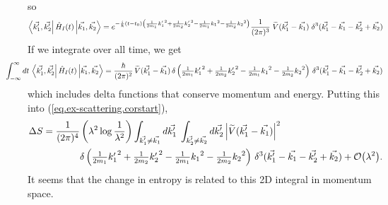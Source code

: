 so 
\[
\left\langle\vec{k_1^\prime}, \vec{k_2^\prime}\right| \hat{H}_I(t)\left|\vec{k_1}, \vec{k_2}\right\rangle
=
e^{-\frac{i}{\hbar}\left(t-t_0\right)\left(\frac{1}{2m_1}{{k_1^\prime}}^2 + \frac{1}{2m_2}{{k_2^\prime}}^2 - \frac{1}{2m_1}{k_1}^2 - \frac{1}{2m_2}{k_2}^2\right)}\frac{1}{(2\pi)^3}\;\widetilde{V}(\vec{k_1^\prime}-\vec{k_1}) \;\delta^3(\vec{k_1^\prime}-\vec{k_1}-\vec{k_2^\prime}+\vec{k_2})
\]
If we integrate over all time, we get
\[
\hspace{-3em}
\int_{-\infty}^\infty dt \,\bra{\vec{k_1^\prime}, \vec{k_2^\prime}} \op{H}_I(t)\ket{\vec{k_1}, \vec{k_2}}
=
\frac{\hbar}{(2\pi)^2}\,\widetilde{V}(\vec{k_1^\prime}-\vec{k_1})\,\delta\left({\textstyle\frac{1}{2m_1}{{k_1^\prime}}^2 + \frac{1}{2m_2}{{k_2^\prime}}^2 - \frac{1}{2m_1}{k_1}^2 - \frac{1}{2m_2}{k_2}^2}\right) \,\delta^3(\vec{k_1^\prime}-\vec{k_1}-\vec{k_2^\prime}+\vec{k_2})
\]
which includes delta functions that conserve momentum and energy.
Putting this into (\ref{eq.ex-scattering.corstart}),
\begin{align}
\Delta S
=\frac{1}{(2\pi)^4}&\left(\lambda^2 \log\frac{1}{\lambda^2}\right) \int_{\vec{k_1^\prime}\neq \vec{k_1}} d\vec{k_1^\prime} \;\int_{\vec{k_2^\prime}\neq \vec{k_2}} d\vec{k_2^\prime} \left|\widetilde{V}(\vec{k_1^\prime}-\vec{k_1})\right|^2\\&\delta\left({\textstyle\frac{1}{2m_1}{{k_1^\prime}}^2 + \frac{1}{2m_2}{{k_2^\prime}}^2 - \frac{1}{2m_1}{k_1}^2 - \frac{1}{2m_2}{k_2}^2}\right) \,\delta^3(\vec{k_1^\prime}-\vec{k_1}-\vec{k_2^\prime}+\vec{k_2}) + \mathcal{O}{\left(\lambda^2\right)}.\nonumber
\end{align}
It seems that the change in entropy is related to this 2D integral in momentum space.


